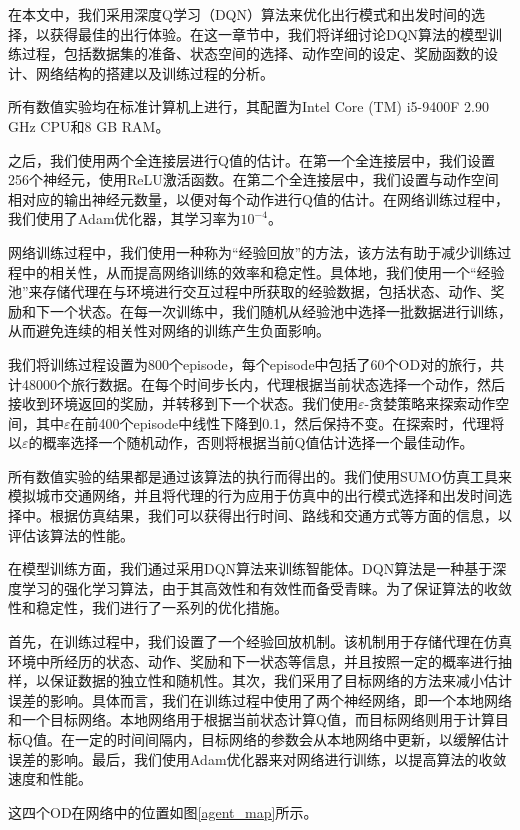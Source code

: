 在本文中，我们采用深度Q学习（DQN）算法来优化出行模式和出发时间的选择，以获得最佳的出行体验。在这一章节中，我们将详细讨论DQN算法的模型训练过程，包括数据集的准备、状态空间的选择、动作空间的设定、奖励函数的设计、网络结构的搭建以及训练过程的分析。

所有数值实验均在标准计算机上进行，其配置为Intel Core (TM) i5-9400F 2.90 GHz CPU和8 GB RAM。

之后，我们使用两个全连接层进行Q值的估计。在第一个全连接层中，我们设置256个神经元，使用ReLU激活函数。在第二个全连接层中，我们设置与动作空间相对应的输出神经元数量，以便对每个动作进行Q值的估计。在网络训练过程中，我们使用了Adam优化器，其学习率为$10^{-4}$。

网络训练过程中，我们使用一种称为“经验回放”的方法，该方法有助于减少训练过程中的相关性，从而提高网络训练的效率和稳定性。具体地，我们使用一个“经验池”来存储代理在与环境进行交互过程中所获取的经验数据，包括状态、动作、奖励和下一个状态。在每一次训练中，我们随机从经验池中选择一批数据进行训练，从而避免连续的相关性对网络的训练产生负面影响。

我们将训练过程设置为800个episode，每个episode中包括了60个OD对的旅行，共计48000个旅行数据。在每个时间步长内，代理根据当前状态选择一个动作，然后接收到环境返回的奖励，并转移到下一个状态。我们使用$\varepsilon$-贪婪策略来探索动作空间，其中$\varepsilon$在前400个episode中线性下降到0.1，然后保持不变。在探索时，代理将以$\varepsilon$的概率选择一个随机动作，否则将根据当前Q值估计选择一个最佳动作。

所有数值实验的结果都是通过该算法的执行而得出的。我们使用SUMO仿真工具来模拟城市交通网络，并且将代理的行为应用于仿真中的出行模式选择和出发时间选择中。根据仿真结果，我们可以获得出行时间、路线和交通方式等方面的信息，以评估该算法的性能。

在模型训练方面，我们通过采用DQN算法来训练智能体。DQN算法是一种基于深度学习的强化学习算法，由于其高效性和有效性而备受青睐。为了保证算法的收敛性和稳定性，我们进行了一系列的优化措施。

首先，在训练过程中，我们设置了一个经验回放机制。该机制用于存储代理在仿真环境中所经历的状态、动作、奖励和下一状态等信息，并且按照一定的概率进行抽样，以保证数据的独立性和随机性。其次，我们采用了目标网络的方法来减小估计误差的影响。具体而言，我们在训练过程中使用了两个神经网络，即一个本地网络和一个目标网络。本地网络用于根据当前状态计算Q值，而目标网络则用于计算目标Q值。在一定的时间间隔内，目标网络的参数会从本地网络中更新，以缓解估计误差的影响。最后，我们使用Adam优化器来对网络进行训练，以提高算法的收敛速度和性能。

这四个OD在网络中的位置如图\ref{agent_map}所示。

